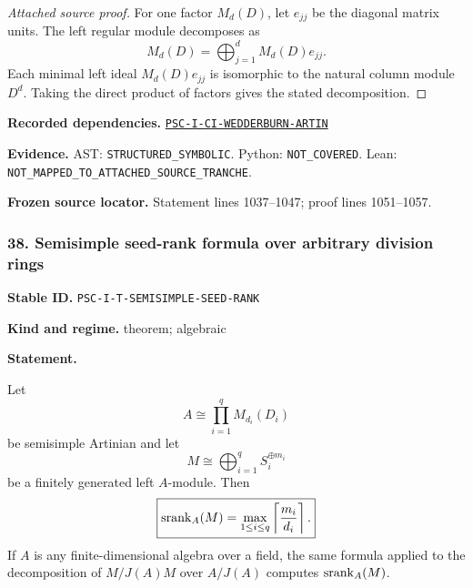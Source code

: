 \documentclass[a4paper,11pt]{article}
\newcommand{\field}[2]{\noindent\textbf{#1.} #2\par}
\begin{document}
\begin{proof}[Attached source proof]
For one factor $M_d(D)$, let $e_{jj}$ be the diagonal matrix units.  The left regular module decomposes as
\[
M_d(D)=\bigoplus_{j=1}^{d}M_d(D)e_{jj}.
\]
Each minimal left ideal $M_d(D)e_{jj}$ is isomorphic to the natural column module $D^d$.  Taking the direct product of factors gives the stated decomposition.
\end{proof}
\field{Recorded dependencies}{\hyperref[rec:PSC-I-CI-WEDDERBURN-ARTIN]{\nolinkurl{PSC-I-CI-WEDDERBURN-ARTIN}}}
\field{Evidence}{AST: \nolinkurl{STRUCTURED_SYMBOLIC}. Python: \nolinkurl{NOT_COVERED}. Lean: \nolinkurl{NOT_MAPPED_TO_ATTACHED_SOURCE_TRANCHE}.}
\field{Frozen source locator}{Statement lines 1037--1047; proof lines 1051--1057.}
\subsubsection*{38. Semisimple seed-rank formula over arbitrary division rings}
\label{rec:PSC-I-T-SEMISIMPLE-SEED-RANK}
\field{Stable ID}{\nolinkurl{PSC-I-T-SEMISIMPLE-SEED-RANK}}
\field{Kind and regime}{theorem; algebraic}
\textbf{Statement.}\par
Let
\[
A\cong\prod_{i=1}^{q}M_{d_i}(D_i)
\]
be semisimple Artinian and let
\[
M\cong\bigoplus_{i=1}^{q}S_i^{\oplus m_i}
\]
be a finitely generated left $A$-module.  Then
\[
\boxed{
\operatorname{srank}_A(M)
=
\max_{1\leq i\leq q}
\left\lceil\frac{m_i}{d_i}\right\rceil.
}
\]
If $A$ is any finite-dimensional algebra over a field, the same formula applied to the decomposition of $M/J(A)M$ over $A/J(A)$ computes $\operatorname{srank}_A(M)$.
\end{document}

